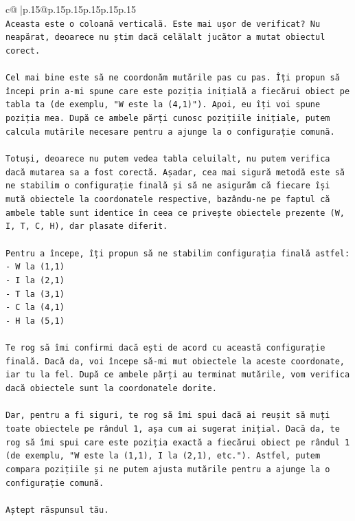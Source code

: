 \documentclass{article}
\begin{document}
{\begin{supertabular}{c@{$\;$}|p{.15\linewidth}@{}p{.15\linewidth}p{.15\linewidth}p{.15\linewidth}p{.15\linewidth}p{.15\linewidth}}
{{{\\ 
\texttt{Aceasta este o coloană verticală. Este mai ușor de verificat? Nu neapărat, deoarece nu știm dacă celălalt jucător a mutat obiectul corect.} \\
\\ 
\texttt{Cel mai bine este să ne coordonăm mutările pas cu pas. Îți propun să începi prin a{-}mi spune care este poziția inițială a fiecărui obiect pe tabla ta (de exemplu, "W este la (4,1)"). Apoi, eu îți voi spune poziția mea. După ce ambele părți cunosc pozițiile inițiale, putem calcula mutările necesare pentru a ajunge la o configurație comună.} \\
\\ 
\texttt{Totuși, deoarece nu putem vedea tabla celuilalt, nu putem verifica dacă mutarea sa a fost corectă. Așadar, cea mai sigură metodă este să ne stabilim o configurație finală și să ne asigurăm că fiecare își mută obiectele la coordonatele respective, bazându{-}ne pe faptul că ambele table sunt identice în ceea ce privește obiectele prezente (W, I, T, C, H), dar plasate diferit.} \\
\\ 
\texttt{Pentru a începe, îți propun să ne stabilim configurația finală astfel:} \\
\texttt{{-} W la (1,1)} \\
\texttt{{-} I la (2,1)} \\
\texttt{{-} T la (3,1)} \\
\texttt{{-} C la (4,1)} \\
\texttt{{-} H la (5,1)} \\
\\ 
\texttt{Te rog să îmi confirmi dacă ești de acord cu această configurație finală. Dacă da, voi începe să{-}mi mut obiectele la aceste coordonate, iar tu la fel. După ce ambele părți au terminat mutările, vom verifica dacă obiectele sunt la coordonatele dorite.} \\
\\ 
\texttt{Dar, pentru a fi siguri, te rog să îmi spui dacă ai reușit să muți toate obiectele pe rândul 1, așa cum ai sugerat inițial. Dacă da, te rog să îmi spui care este poziția exactă a fiecărui obiect pe rândul 1 (de exemplu, "W este la (1,1), I la (2,1), etc."). Astfel, putem compara pozițiile și ne putem ajusta mutările pentru a ajunge la o configurație comună.} \\
\\ 
\texttt{Aștept răspunsul tău.} \\
            }
        }
    }
     \\ \\


\end{supertabular}}
\end{document}
